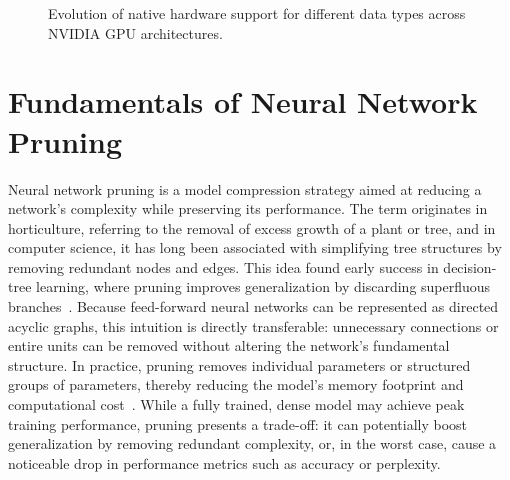 \begin{figure}[ht]
  \centering
  \caption{Evolution of native hardware support for different data types across NVIDIA GPU architectures.}
  \label{fig:hw_support}
\end{figure}

\section{Fundamentals of Neural Network Pruning}

Neural network pruning is a model compression strategy aimed at reducing a network's complexity while preserving its performance. The term originates in horticulture, referring to the removal of excess growth of a plant or tree, and in computer science, it has long been associated with simplifying tree structures by removing redundant nodes and edges. This idea found early success in decision-tree learning, where pruning improves generalization by discarding superfluous branches~\cite{patil2010evaluation,aksoy2005rules3}. Because feed-forward neural networks can be represented as directed acyclic graphs, this intuition is directly transferable: unnecessary connections or entire units can be removed without altering the network's fundamental structure. In practice, pruning removes individual parameters or structured groups of parameters, thereby reducing the model's memory footprint and computational cost~\cite{cheng2025survey,nguyen2017nettrim}. While a fully trained, dense model may achieve peak training performance, pruning presents a trade-off: it can potentially boost generalization by removing redundant complexity, or, in the worst case, cause a noticeable drop in performance metrics such as accuracy or perplexity.

